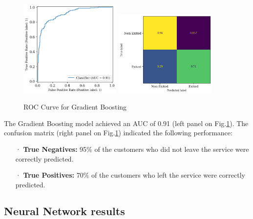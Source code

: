 \documentclass[12pt]{article}
\begin{document}
\begin{figure}[h!]
    \centering
    \includegraphics[width=0.45\textwidth]{figures/roc_curve_gb.png}
    \includegraphics[width=0.45\textwidth]{figures/confusion_matrix_gb.png}
    \caption{ROC Curve for Gradient Boosting}
    \label{fig:roc_curve_gb}
\end{figure}

The Gradient Boosting model achieved an AUC of 0.91 (left panel on Fig.\ref{fig:roc_curve_gb}). The confusion matrix (right panel on Fig.\ref{fig:roc_curve_gb}) indicated the following performance:
\begin{itemize}
    \item[·] \textbf{True Negatives:} 95\% of the customers who did not leave the service were correctly predicted.
    \item[·] \textbf{True Positives:} 70\% of the customers who left the service were correctly predicted.
\end{itemize}

\subsection{Neural Network results}
\end{document}
